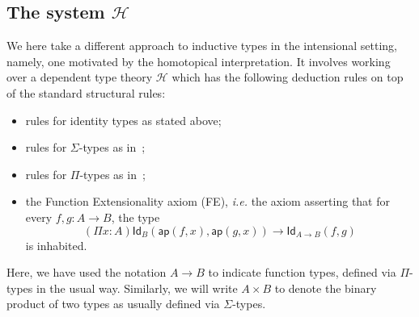 \documentclass[11pt]{article}
\newcommand{\Id}{\mathsf{Id}}
\newcommand{\id}[1]{\Id_{#1}}
\newcommand{\app}{\mathsf{ap}}
\newcommand{\Hint}{\mathcal{H}}
\theoremstyle{definition}
\begin{document}
\subsection{The system $\Hint$} 

\noindent We here take a different approach to inductive types in the intensional setting, namely, one motivated by the homotopical interpretation.  It involves working over a dependent type theory $\Hint$ which has the following deduction rules on top of the standard structural rules:
\begin{itemize}
\item rules for identity types as stated above;
\item rules for $\Sigma$-types as in~\cite[Section~5.8]{NordstromB:marltt};
\item rules for $\Pi$-types as in~\cite[Section~3.2]{GarnerR:strdpt}; 
\item the Function Extensionality axiom (FE), \emph{i.e.} the axiom asserting that
for every $f, g : A \rightarrow B$, the type
\[
(\Pi x :  A)\id{B}( \app(f, x), \app(g, x)) \rightarrow \id{A \rightarrow B}(f,g) 
\]
is inhabited.
\end{itemize}
Here, we have used the notation $A \rightarrow B$ to indicate function types, defined via
$\Pi$-types in the usual way. Similarly, we will write $A \times B$ to denote the binary product
of two types as usually defined via $\Sigma$-types.
\smallskip
\end{document}
